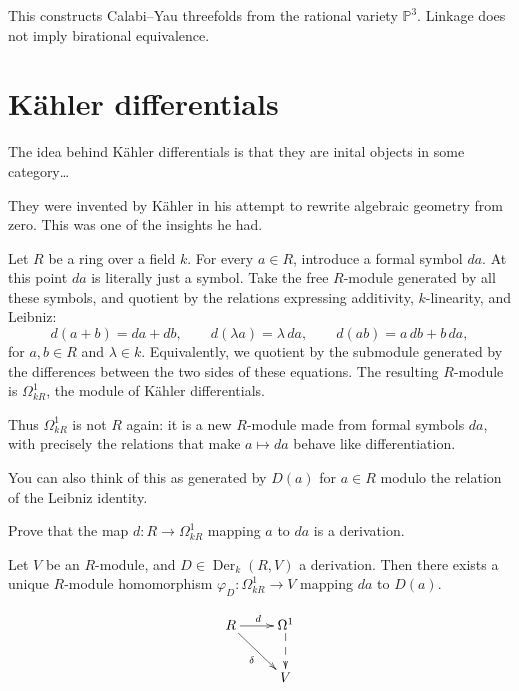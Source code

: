 \noindent
This constructs Calabi--Yau threefolds
from the rational variety $\mathbb{P}^3$.
Linkage does not imply birational
equivalence.

\section{Kähler differentials}
\label{section-kahler-differentials}

\noindent
The idea behind Kähler differentials
is that they are inital objects
in some category…

They were invented by Kähler in his
attempt to rewrite algebraic geometry
from zero. This was one of the insights
he had.

\begin{definition}
\label{definition-kahler-differentials}
Let $R$ be a ring over a field $k$.
For every $a\in R$, introduce a formal
symbol $da$. At this point $da$ is
literally just a symbol. Take the free
$R$-module generated by all these symbols,
and quotient by the relations expressing
additivity, $k$-linearity, and Leibniz:
$$
d(a+b)=da+db,\qquad
d(\lambda a)=\lambda\,da,\qquad
d(ab)=a\,db+b\,da,
$$
for $a,b\in R$ and $\lambda\in k$.
Equivalently, we quotient by the
submodule generated by the differences
between the two sides of these equations.
The resulting $R$-module is
$\Omega^1_{kR}$, the module of
K\"ahler differentials.
\end{definition}

\noindent
Thus $\Omega^1_{kR}$ is not $R$ again:
it is a new $R$-module made from formal
symbols $da$, with precisely the relations
that make $a\mapsto da$ behave like
differentiation.

\noindent
You can also think of this as generated
by $D(a)$ for $a \in R$ modulo the relation
of the Leibniz identity.

\begin{exercise}
\label{exercise-kahler-differentials-derivation}
Prove that the map
$d:R\to\Omega^1_{kR}$ mapping $a$ to $da$
is a derivation.
\end{exercise}

\begin{lemma}
\label{lemma-universal-property-kahler-differentials}
Let $V$ be an $R$-module, and
$D\in\operatorname{Der}_k(R,V)$ a
derivation. Then there exists a unique
$R$-module homomorphism
$\varphi_D:\Omega^1_{kR}\to V$ mapping
$da$ to $D(a)$.
\end{lemma}
$$
\xymatrix{
R \ar[r]^d \ar[dr]_{\delta}&  
\Omega^1\ar@{-->}[d]\\
&V
}
$$


